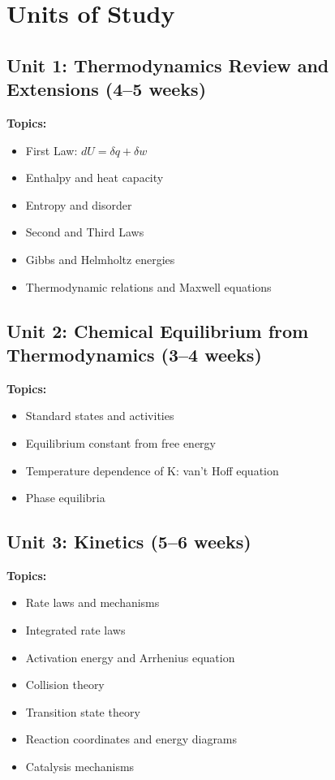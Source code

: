 \documentclass[12pt,oneside]{book}
\begin{document}
\section{Units of Study}

\subsection{Unit 1: Thermodynamics Review and Extensions (4--5 weeks)}

\textbf{Topics:}
\begin{itemize}
    \item First Law: $dU = \delta q + \delta w$
    \item Enthalpy and heat capacity
    \item Entropy and disorder
    \item Second and Third Laws
    \item Gibbs and Helmholtz energies
    \item Thermodynamic relations and Maxwell equations
\end{itemize}

\subsection{Unit 2: Chemical Equilibrium from Thermodynamics (3--4 weeks)}

\textbf{Topics:}
\begin{itemize}
    \item Standard states and activities
    \item Equilibrium constant from free energy
    \item Temperature dependence of K: van't Hoff equation
    \item Phase equilibria
\end{itemize}

\subsection{Unit 3: Kinetics (5--6 weeks)}

\textbf{Topics:}
\begin{itemize}
    \item Rate laws and mechanisms
    \item Integrated rate laws
    \item Activation energy and Arrhenius equation
    \item Collision theory
    \item Transition state theory
    \item Reaction coordinates and energy diagrams
    \item Catalysis mechanisms
\end{itemize}
\end{document}
